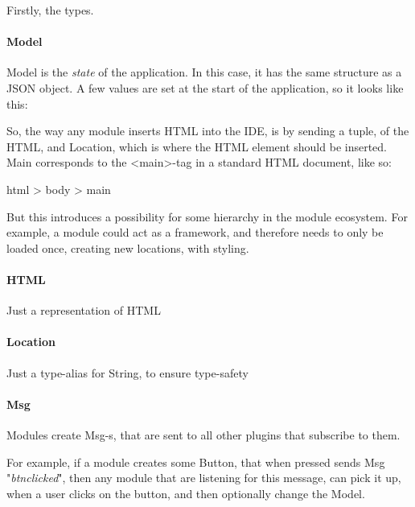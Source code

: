 Firstly, the types.

\paragraph{Model}
Model is the \textit{state} of the application. In this case, it has the same
structure as a JSON object. A few values are set at the start of the
application, so it looks like this:


So, the way any module inserts HTML into the IDE, is by sending a tuple, of the
HTML, and Location, which is where the HTML element should be inserted. Main
corresponds to the <main>-tag in a standard HTML document, like so:

html > body > main

But this introduces a possibility for some hierarchy in the module ecosystem.
For example, a module could act as a framework, and therefore needs to only be
loaded once, creating new locations, with styling.


\paragraph{HTML}
Just a representation of HTML


\paragraph{Location}
Just a type-alias for String, to ensure type-safety


\paragraph{Msg}
Modules create Msg-s, that are sent to all other plugins that subscribe to them.

For example, if a module creates some Button, that when pressed sends
Msg "\textit{btn\-clicked}", then any module that are listening for this message, can pick
it up, when a user clicks on the button, and then optionally change the Model.
